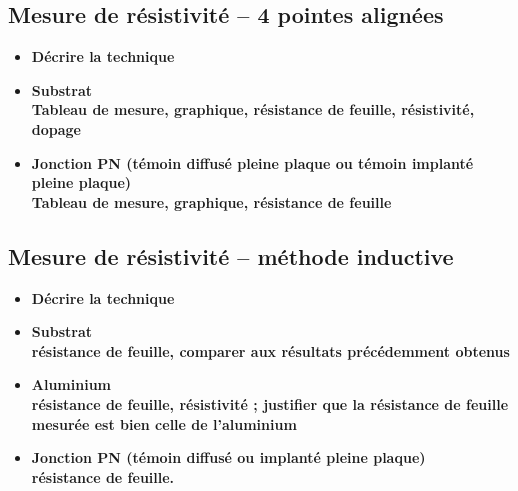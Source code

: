 \documentclass[11pt]{article}
\begin{document}
\subsection{Mesure de r\'esistivit\'e -- 4 pointes align\'ees}

\begin{itemize}
\item \textbf{ D\'ecrire la technique  }
\item \textbf{ Substrat \\ 
  Tableau de mesure, graphique, r\'esistance de feuille, r\'esistivit\'e, dopage}
\item \textbf{ Jonction PN (t\'emoin diffus\'e pleine plaque ou t\'emoin implant\'e pleine plaque) \\ 
Tableau de mesure, graphique, r\'esistance de feuille}
\end{itemize}

    

\subsection{Mesure de r\'esistivit\'e – m\'ethode inductive}

\begin{itemize}
\item \textbf{ D\'ecrire la technique  }
\item \textbf{ Substrat \\ 
   r\'esistance de feuille, comparer aux r\'esultats pr\'ec\'edemment obtenus}
\item \textbf{ Aluminium \\ 
r\'esistance de feuille, r\'esistivit\'e ; justifier que la r\'esistance de feuille mesur\'ee est bien celle de
     l'aluminium}
\item \textbf{Jonction PN (t\'emoin diffus\'e ou implant\'e pleine plaque) \\
    r\'esistance de feuille.}
\end{itemize}


\iffalse
\subsection{Capacit\'e -- r\'ealisation du di\'electrique}

\begin{itemize}

\item \textbf{Technique utilis\'ee, justifier}


\item \textbf{Profil de temp\'erature, expliquer le r\^ole des \'etapes-cl\'es}

\item \textbf{Calcul de l'\'epaisseur th\'eorique d'oxyde, comparer \`a la valeur mesur\'ee. Quelle est l'\'epaisseur de Si
        consomm\'e pour former cette couche de SiO2 ?}
\end{itemize}
\fi 
\end{document}

